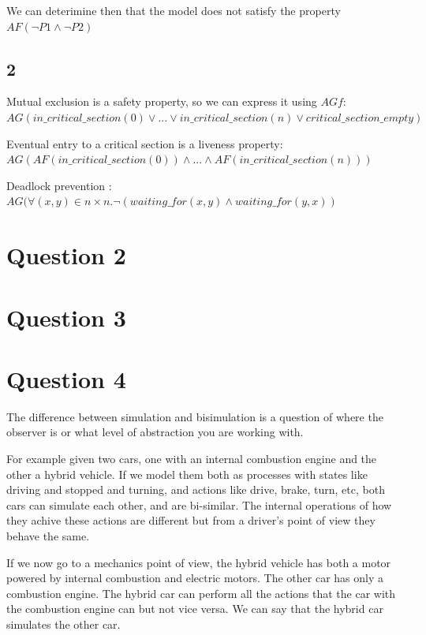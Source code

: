 \documentclass{scrartcl}
\begin{document}
We can deterimine then that the model does not satisfy the property $AF(\neg P1 \wedge \neg P2)$

\subsection{2}
Mutual exclusion is a safety property, so we can express it using $AGf$: 
$AG(in\_critical\_section(0)  \vee ...\vee in\_critical\_section(n) \vee critical\_section\_empty)$

Eventual entry to a critical section is a liveness property: $AG(AF(in\_critical\_section(0)) \wedge ... \wedge AF(in\_critical\_section(n)))$

Deadlock prevention : $AG(\forall (x, y) \in n \times n. \neg (waiting\_for(x, y) \wedge waiting\_for(y, x))$

\section{Question 2}
\section{Question 3}
\section{Question 4}
The difference between simulation and bisimulation is a question of where the observer is or what level of abstraction you are working with.

For example given two cars, one with an internal combustion engine and the other a hybrid vehicle. If we model them both as processes with states like driving and stopped and turning, and actions like drive, brake, turn, etc, both cars can simulate each other, and are bi-similar. The internal operations of how they achive these actions are different but from a driver's point of view they behave the same.

If we now go to a mechanics point of view, the hybrid vehicle has both a motor powered by internal combustion and electric motors. The other car has only a combustion engine. The hybrid car can perform all the actions that the car with the combustion engine can but not vice versa. We can say that the hybrid car simulates the other car.
\end{document}
